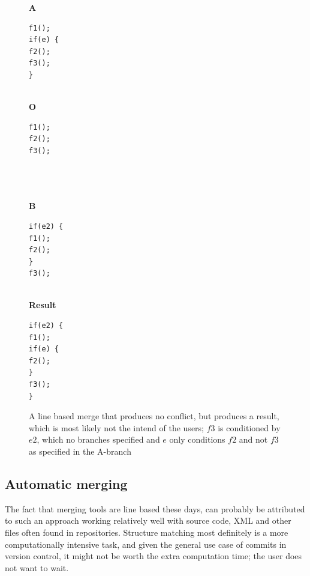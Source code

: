 \documentclass[11pt]{article}
\begin{document}
\begin{figure}

\begin{multicols*}{4}

\textbf{A}


\begin{lstlisting}[language=CSharp]
f1();
if(e) {
f2();
f3();
}


\end{lstlisting}

\columnbreak

\textbf{O}

\begin{lstlisting}[language=CSharp]
f1();
f2();
f3();




\end{lstlisting}

\columnbreak

\textbf{B}
 
\begin{lstlisting}[language=CSharp]
if(e2) {
f1();
f2();
}
f3();


\end{lstlisting}

\columnbreak

\textbf{Result}
 
\begin{lstlisting}[language=CSharp]
if(e2) {
f1();
if(e) {
f2();
}
f3();
}
\end{lstlisting}
\end{multicols*}
\caption{A line based merge that produces no conflict, but produces a result, which is most likely not the intend of the users; $f3$ is conditioned by $e2$, which no branches specified and $e$ only conditions $f2$ and not $f3$ as specified in the A-branch}
\label{WrongMergeFromLineBasedApproach}

\end{figure}

\subsection{Automatic merging}
The fact that merging tools are line based these days, can probably be attributed to such an approach working relatively well with source code, XML and other files often found in repositories. Structure matching most definitely is a more computationally intensive task, and given the general use case of commits in version control, it might not be worth the extra computation time; the user does not want to wait.
\end{document}
